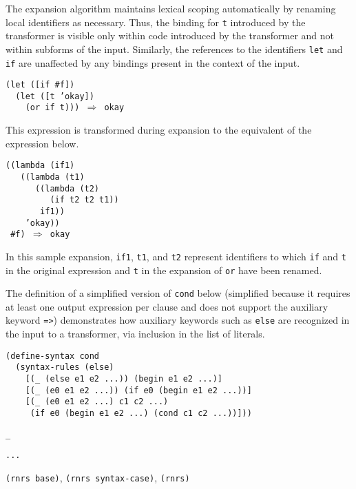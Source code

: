 The expansion algorithm maintains lexical scoping automatically
by renaming local identifiers as necessary.
Thus, the binding for \texttt{t} introduced by the transformer is visible
only within code introduced by the transformer and not within
subforms of the input.
Similarly, the references to the identifiers \texttt{let} and \texttt{if} are
unaffected by any bindings present in the context of the input.


\begin{alltt}
(let ([if \#{}f])
  (let ([t 'okay])
    (or if t))) \(\Rightarrow\) okay
\end{alltt}


This expression is transformed during expansion to the equivalent of
the expression below.


\begin{alltt}
((lambda (if1)
   ((lambda (t1)
      ((lambda (t2)
         (if t2 t2 t1))
       if1))
    'okay))
 \#{}f) \(\Rightarrow\) okay
\end{alltt}


In this sample expansion, \texttt{if1}, \texttt{t1}, and \texttt{t2}
represent identifiers to which \texttt{if} and \texttt{t} in the
original expression and \texttt{t} in the expansion of \texttt{or} have
been renamed.


The definition of a simplified version of \texttt{cond} below
(simplified because it requires
at least one output expression per clause and 
does not support the auxiliary keyword \texttt{=\textgreater{}})
demonstrates how auxiliary keywords such as \texttt{else} are recognized
in the input to a transformer, via inclusion in the list of
literals.


\begin{alltt}
(define-syntax cond
  (syntax-rules (else)
    [(\_{} (else e1 e2 ...)) (begin e1 e2 ...)]
    [(\_{} (e0 e1 e2 ...)) (if e0 (begin e1 e2 ...))]
    [(\_{} (e0 e1 e2 ...) c1 c2 ...)
     (if e0 (begin e1 e2 ...) (cond c1 c2 ...))]))
\end{alltt}

\begin{description}

\label{syntax_s26}\item[syntax] \texttt{\_{}}



\item[syntax] \texttt{...}



\item[libraries] \texttt{(rnrs base)}, \texttt{(rnrs syntax-case)}, \texttt{(rnrs)}
\end{description}


